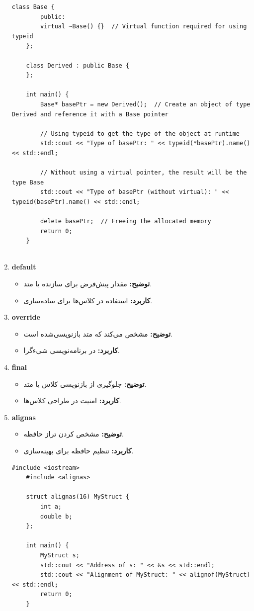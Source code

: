 \documentclass[12pt, a4paper]{report}
\begin{document}
\begin{enumerate}
\begin{lstlisting}[breaklines=true]
	class Base {
		public:
		virtual ~Base() {}  // Virtual function required for using typeid
	};
	
	class Derived : public Base {
	};
	
	int main() {
		Base* basePtr = new Derived();  // Create an object of type Derived and reference it with a Base pointer
		
		// Using typeid to get the type of the object at runtime
		std::cout << "Type of basePtr: " << typeid(*basePtr).name() << std::endl;
		
		// Without using a virtual pointer, the result will be the type Base
		std::cout << "Type of basePtr (without virtual): " << typeid(basePtr).name() << std::endl;
		
		delete basePtr;  // Freeing the allocated memory
		return 0;
	}
	
\end{lstlisting}
\RTL
	\item \textbf{default}
	\begin{itemize}
		\item \textbf{توضیح:} مقدار پیش‌فرض برای سازنده یا متد.
		\item \textbf{کاربرد:} استفاده در کلاس‌ها برای ساده‌سازی.
	\end{itemize}
	\item \textbf{override}
	\begin{itemize}
		\item \textbf{توضیح:} مشخص می‌کند که متد بازنویسی‌شده است.
		\item \textbf{کاربرد:} در برنامه‌نویسی شیءگرا.
	\end{itemize}
	\item \textbf{final}
	\begin{itemize}
		\item \textbf{توضیح:} جلوگیری از بازنویسی کلاس یا متد.
		\item \textbf{کاربرد:} امنیت در طراحی کلاس‌ها.
	\end{itemize}
	\item \textbf{alignas}
	\begin{itemize}
		\item \textbf{توضیح:} مشخص کردن تراز حافظه.
		\item \textbf{کاربرد:} تنظیم حافظه برای بهینه‌سازی.
	\end{itemize}
		\LTR
	\begin{lstlisting}[breaklines=true]
	#include <iostream>
	#include <alignas>
	
	struct alignas(16) MyStruct {
		int a;
		double b;
	};
	
	int main() {
		MyStruct s;
		std::cout << "Address of s: " << &s << std::endl;
		std::cout << "Alignment of MyStruct: " << alignof(MyStruct) << std::endl;
		return 0;
	}
		\end{lstlisting}
	\RTL
\end{enumerate}
\end{document}
